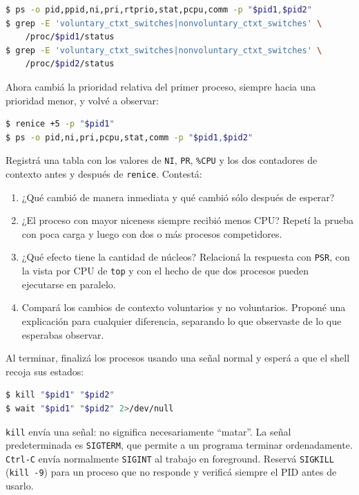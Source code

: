 \documentclass[11pt,a4paper]{article}
\begin{document}
\begin{lstlisting}[language=bash]
$ ps -o pid,ppid,ni,pri,rtprio,stat,pcpu,comm -p "$pid1,$pid2"
$ grep -E 'voluntary_ctxt_switches|nonvoluntary_ctxt_switches' \
    /proc/$pid1/status
$ grep -E 'voluntary_ctxt_switches|nonvoluntary_ctxt_switches' \
    /proc/$pid2/status
\end{lstlisting}

Ahora cambiá la prioridad relativa del primer proceso, siempre hacia una
prioridad menor, y volvé a observar:

\begin{lstlisting}[language=bash]
$ renice +5 -p "$pid1"
$ ps -o pid,ni,pri,pcpu,stat,comm -p "$pid1,$pid2"
\end{lstlisting}

Registrá una tabla con los valores de \texttt{NI}, \texttt{PR}, \texttt{\%CPU}
y los dos contadores de contexto antes y después de \texttt{renice}. Contestá:

\begin{enumerate}
  \item ¿Qué cambió de manera inmediata y qué cambió sólo después de esperar?
  \item ¿El proceso con mayor niceness siempre recibió menos CPU? Repetí la
  prueba con poca carga y luego con dos o más procesos competidores.
  \item ¿Qué efecto tiene la cantidad de núcleos? Relacioná la respuesta con
  \texttt{PSR}, con la vista por CPU de \texttt{top} y con el hecho de que
  dos procesos pueden ejecutarse en paralelo.
  \item Compará los cambios de contexto voluntarios y no voluntarios. Proponé
  una explicación para cualquier diferencia, separando lo que observaste de
  lo que esperabas observar.
\end{enumerate}

Al terminar, finalizá los procesos usando una señal normal y esperá a que el
shell recoja sus estados:

\begin{lstlisting}[language=bash]
$ kill "$pid1" "$pid2"
$ wait "$pid1" "$pid2" 2>/dev/null
\end{lstlisting}

\begin{infobox}
\texttt{kill} envía una señal: no significa necesariamente ``matar''. La
señal predeterminada es \texttt{SIGTERM}, que permite a un programa terminar
ordenadamente. \texttt{Ctrl-C} envía normalmente \texttt{SIGINT} al trabajo en
foreground. Reservá \texttt{SIGKILL} (\texttt{kill -9}) para un proceso que no
responde y verificá siempre el PID antes de usarlo.
\end{infobox}
\end{document}
